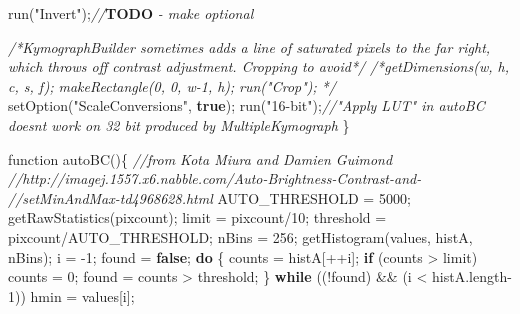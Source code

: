 \documentclass[
  12pt,
  a4paper,
]{book}
\newenvironment{Shaded}{}{}
\newcommand{\AlertTok}[1]{\textcolor[rgb]{1.00,0.00,0.00}{\textbf{#1}}}
\newcommand{\CommentTok}[1]{\textcolor[rgb]{0.38,0.63,0.69}{\textit{#1}}}
\newcommand{\ControlFlowTok}[1]{\textcolor[rgb]{0.00,0.44,0.13}{\textbf{#1}}}
\newcommand{\DecValTok}[1]{\textcolor[rgb]{0.25,0.63,0.44}{#1}}
\newcommand{\KeywordTok}[1]{\textcolor[rgb]{0.00,0.44,0.13}{\textbf{#1}}}
\newcommand{\NormalTok}[1]{#1}
\newcommand{\OperatorTok}[1]{\textcolor[rgb]{0.40,0.40,0.40}{#1}}
\newcommand{\StringTok}[1]{\textcolor[rgb]{0.25,0.44,0.63}{#1}}
\begin{document}
\begin{Shaded}
\begin{Highlighting}[]
\NormalTok{    run}\OperatorTok{(}\StringTok{"Invert"}\OperatorTok{);}\CommentTok{//}\AlertTok{TODO}\CommentTok{ {-} make optional}
    
    \CommentTok{/*KymographBuilder sometimes adds a line of saturated pixels to the far right, }
\CommentTok{    which throws off contrast adjustment.  Cropping to avoid*/}
    \CommentTok{/*getDimensions(w, h, c, s, f);}
\CommentTok{    makeRectangle(0, 0, w{-}1, h);}
\CommentTok{    run("Crop");}
\CommentTok{    */}
\NormalTok{    setOption}\OperatorTok{(}\StringTok{"ScaleConversions"}\OperatorTok{,} \KeywordTok{true}\OperatorTok{);}
\NormalTok{    run}\OperatorTok{(}\StringTok{"16{-}bit"}\OperatorTok{);}\CommentTok{//"Apply LUT" in autoBC doesn\textquotesingle{}t work on 32 bit produced by MultipleKymograph}
\OperatorTok{\}}

\NormalTok{function autoBC}\OperatorTok{()\{}
\CommentTok{//from Kota Miura and Damien Guimond }
\CommentTok{//http://imagej.1557.x6.nabble.com/Auto{-}Brightness{-}Contrast{-}and{-}}
\CommentTok{//setMinAndMax{-}td4968628.html}
\NormalTok{    AUTO\_THRESHOLD }\OperatorTok{=} \DecValTok{5000}\OperatorTok{;} 
\NormalTok{    getRawStatistics}\OperatorTok{(}\NormalTok{pixcount}\OperatorTok{);} 
\NormalTok{    limit }\OperatorTok{=}\NormalTok{ pixcount}\OperatorTok{/}\DecValTok{10}\OperatorTok{;} 
\NormalTok{    threshold }\OperatorTok{=}\NormalTok{ pixcount}\OperatorTok{/}\NormalTok{AUTO\_THRESHOLD}\OperatorTok{;} 
\NormalTok{    nBins }\OperatorTok{=} \DecValTok{256}\OperatorTok{;} 
\NormalTok{    getHistogram}\OperatorTok{(}\NormalTok{values}\OperatorTok{,}\NormalTok{ histA}\OperatorTok{,}\NormalTok{ nBins}\OperatorTok{);} 
\NormalTok{    i }\OperatorTok{=} \OperatorTok{{-}}\DecValTok{1}\OperatorTok{;} 
\NormalTok{    found }\OperatorTok{=} \KeywordTok{false}\OperatorTok{;} 
    \ControlFlowTok{do} \OperatorTok{\{} 
\NormalTok{            counts }\OperatorTok{=}\NormalTok{ histA}\OperatorTok{[++}\NormalTok{i}\OperatorTok{];} 
            \ControlFlowTok{if} \OperatorTok{(}\NormalTok{counts }\OperatorTok{\textgreater{}}\NormalTok{ limit}\OperatorTok{)}\NormalTok{ counts }\OperatorTok{=} \DecValTok{0}\OperatorTok{;} 
\NormalTok{            found }\OperatorTok{=}\NormalTok{ counts }\OperatorTok{\textgreater{}}\NormalTok{ threshold}\OperatorTok{;} 
    \OperatorTok{\}} \ControlFlowTok{while} \OperatorTok{((!}\NormalTok{found}\OperatorTok{)} \OperatorTok{\&\&} \OperatorTok{(}\NormalTok{i }\OperatorTok{\textless{}}\NormalTok{ histA}\OperatorTok{.}\NormalTok{length}\OperatorTok{{-}}\DecValTok{1}\OperatorTok{))} 
\NormalTok{    hmin }\OperatorTok{=}\NormalTok{ values}\OperatorTok{[}\NormalTok{i}\OperatorTok{];} 

\end{Highlighting}
\end{Shaded}
\end{document}
